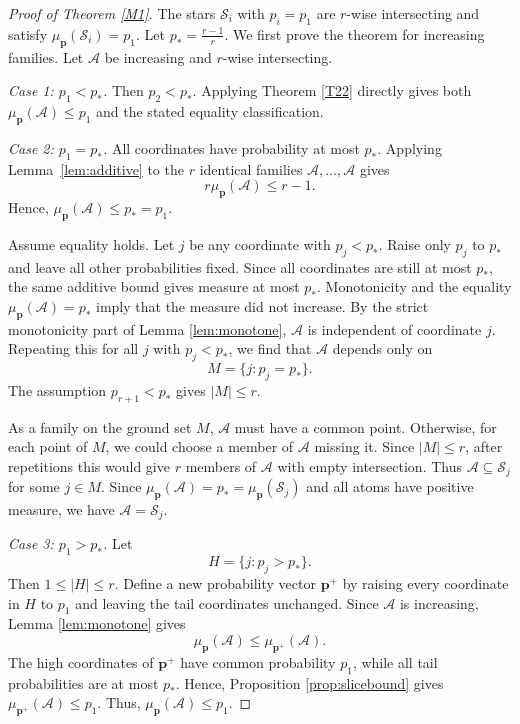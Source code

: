 \documentclass[11pt]{article}
\begin{document}
\begin{proof}[Proof of Theorem \ref{M1}]
The stars $\mathcal S_i$ with $p_i=p_1$ are $r$-wise intersecting and satisfy
$\mu_{\mathbf p}(\mathcal S_i)=p_1$.
Let $p_*=\frac{r-1}{r}$.
We first prove the theorem for increasing families.  Let $\mathcal A$ be increasing
and $r$-wise intersecting.

\smallskip
\noindent\textit{Case 1: $p_1<p_*$.}
Then $p_2<p_*$. Applying Theorem \ref{T22} directly gives both
$\mu_{\mathbf p}(\mathcal A)\le p_1$ and the stated equality classification.

\smallskip
\noindent\textit{Case 2: $p_1=p_*$.}
All coordinates have probability at most $p_*$.  Applying
Lemma~\ref{lem:additive} to the $r$ identical families
$\mathcal A,\ldots,\mathcal A$ gives
$$
 r\mu_{\mathbf p}(\mathcal A)\le r-1.
$$
Hence, $\mu_{\mathbf p}(\mathcal A)\le p_*=p_1$.

Assume equality holds.  Let $j$ be any coordinate with $p_j<p_*$.  Raise
only $p_j$ to $p_*$ and leave all other probabilities fixed.  Since all
coordinates are still at most $p_*$, the same additive bound gives measure
at most $p_*$.  Monotonicity and the equality
$\mu_{\mathbf p}(\mathcal A)=p_*$ imply that the measure did not increase.  By
the strict monotonicity part of Lemma \ref{lem:monotone}, $\mathcal A$ is independent of
coordinate $j$.  Repeating this for all $j$ with $p_j<p_*$, we find that
$\mathcal A$ depends only on
$$
 M=\{j:p_j=p_*\}.
$$
The assumption $p_{r+1}<p_*$ gives $|M|\le r$.

As a family on the ground set $M$, $\mathcal A$ must have a common point.  Otherwise,
for each point of $M$, we could choose a member of $\mathcal A$ missing it. Since
$|M|\le r$, after repetitions this would give $r$ members of $\mathcal A$ with
empty intersection.  Thus $\mathcal A\subseteq\mathcal S_j$ for some $j\in M$.  Since
$\mu_{\mathbf p}(\mathcal A)=p_*=\mu_{\mathbf p}(\mathcal S_j)$ and all atoms have
positive measure, we have $\mathcal A=\mathcal S_j$.

\smallskip
\noindent\textit{Case 3: $p_1>p_*$.}
Let
\[
 H=\{j:p_j>p_*\}.
\]
Then $1\le |H|\le r$.  Define a new probability vector $\mathbf p^+$ by raising
every coordinate in $H$ to $p_1$ and leaving the tail coordinates unchanged.
Since $\mathcal A$ is increasing, Lemma \ref{lem:monotone} gives
$$
 \mu_{\mathbf p}(\mathcal A)\le \mu_{\mathbf p^+}(\mathcal A).
$$
The high coordinates of $\mathbf p^+$ have common probability $p_1$, while all
tail probabilities are at most $p_*$.  Hence, Proposition \ref{prop:slicebound} gives
$\mu_{\mathbf p^+}(\mathcal A)\le p_1$.  Thus, $\mu_{\mathbf p}(\mathcal A)\le p_1$.


\end{proof}
\end{document}
